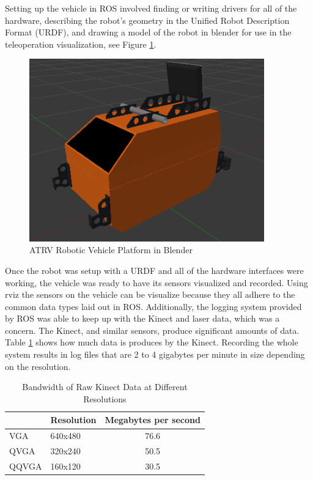 \documentclass[12pt]{report}
\begin{document}
Setting up the vehicle in ROS involved finding or writing drivers for all of the hardware, describing the robot's geometry in the Unified Robot Description Format (URDF), and drawing a model of the robot in blender for use in the teleoperation visualization, see Figure \ref{fig:atrv_blender}.

\begin{figure}[ht]
  \centering
  \includegraphics[width=4in,keepaspectratio]{atrv_blender.png}
  \caption{ATRV Robotic Vehicle Platform in Blender}
  \label{fig:atrv_blender}
\end{figure}

Once the robot was setup with a URDF and all of the hardware interfaces were working, the vehicle was ready to have its sensors visualized and recorded.  Using rviz the sensors on the vehicle can be visualize because they all adhere to the common data types laid out in ROS.  Additionally, the logging system provided by ROS was able to keep up with the Kinect and laser data, which was a concern.  The Kinect, and similar sensors, produce significant amounts of data.  Table \ref{tab:kinect_data} shows how much data is produces by the Kinect.  Recording the whole system results in log files that are 2 to 4 gigabytes per minute in size depending on the resolution.

\begin{table}
\caption{Bandwidth of Raw Kinect Data at Different Resolutions}
\label{tab:kinect_data}
\begin{center}
  \begin{tabular}{ | l | l | c | }
    \hline
    ~ & Resolution & Megabytes per second \\
    \hline
    VGA & 640x480 & 76.6 \\
    QVGA & 320x240 & 50.5 \\
    QQVGA & 160x120 & 30.5 \\
    \hline
  \end{tabular}
\end{center}
\end{table}
\end{document}
